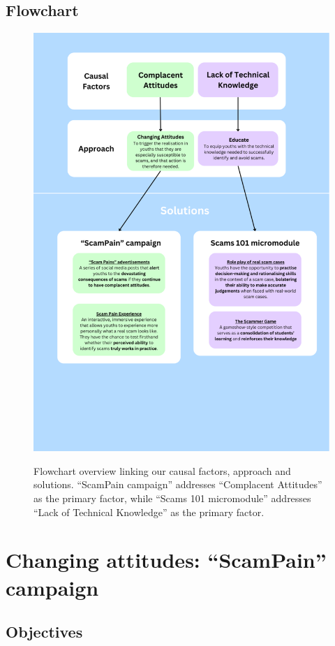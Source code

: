 \documentclass[a4paper]{article}
\begin{document}
\subsection{Flowchart}
\begin{figure}[ht!]
  \centering \includegraphics[width=\textwidth]{flowchart}\label{fig:flowchart}
  \caption{Flowchart overview linking our causal factors, approach and
    solutions. ``ScamPain campaign'' addresses ``Complacent Attitudes'' as the
    primary factor, while ``Scams 101 micromodule'' addresses ``Lack of
    Technical Knowledge'' as the primary factor.}
\end{figure}

\section{Changing attitudes: ``ScamPain'' campaign}
\subsection{Objectives}
\end{document}
